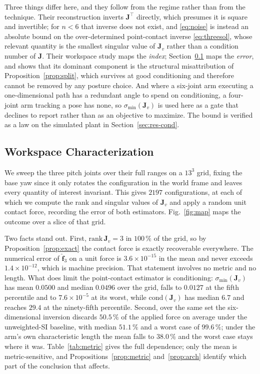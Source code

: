 \documentclass{ieeeaccess}
\newcommand{\Jv}{\bm{J}_{\!v}}
\newcommand{\Jfull}{\bm{J}}
\begin{document}
Three things differ here, and they follow from the regime rather than from the
technique. Their reconstruction inverts $\bm J^{\!\top}$ directly, which presumes
it is square and invertible; for $n<6$ that inverse does not exist, and
\eqref{eq:noise} is instead an absolute bound on the over-determined point-contact
inverse \eqref{eq:threesol}, whose relevant quantity is the smallest singular value
of $\Jv$ rather than a condition number of $\Jfull$. Their workspace study maps the
\emph{index}; Section~\ref{sec:sweep} maps the \emph{error}, and shows that its
dominant component is the structural misattribution of
Proposition~\ref{prop:split}, which survives at good conditioning and therefore
cannot be removed by any posture choice. And where a six-joint arm executing a
one-dimensional path has a redundant angle to spend on conditioning, a four-joint
arm tracking a pose has none, so $\sigma_{\min}(\Jv)$ is used here as a gate that
declines to report rather than as an objective to maximize. The bound is verified
as a law on the simulated plant in Section~\ref{sec:res-cond}.

\subsection{Workspace Characterization}
\label{sec:sweep}
We sweep the three pitch joints over their full ranges on a $13^3$ grid, fixing
the base yaw since it only rotates the configuration in the world frame and leaves every
quantity of interest invariant. This gives $2197$ configurations, at each of which
we compute the rank and singular values of $\Jv$ and apply a random unit contact
force, recording the error of both estimators. Fig.~\ref{fig:map} maps the
outcome over a slice of that grid.


Two facts stand out. First, $\mathrm{rank}\,\Jv=3$ in $100\,\%$ of the grid, so by
Proposition~\ref{prop:exact} the contact force is exactly recoverable everywhere.
The numerical error of $\hat{\bm f}_{3}$ on a unit force is $3.6\times10^{-15}$ in
the mean and never exceeds $1.4\times10^{-12}$, which is machine precision. That
statement involves no metric and no length. What does limit the point-contact
estimator is conditioning: $\sigma_{\min}(\Jv)$ has mean $0.0500$ and median
$0.0496$ over the grid, falls to $0.0127$ at the fifth percentile and to
$7.6\times10^{-5}$ at its worst, while $\mathrm{cond}(\Jv)$ has median $6.7$ and
reaches $29.4$ at the ninety-fifth percentile. Second, over the same set the
six-dimensional inversion discards $50.5\,\%$ of the applied force on average
under the unweighted-SI baseline, with median $51.1\,\%$ and a worst case of
$99.6\,\%$; under the arm's own characteristic length the mean falls to
$38.0\,\%$ and the worst case stays where it was. Table~\ref{tab:metric} gives the full dependence; only
the mean is metric-sensitive, and Propositions~\ref{prop:metric}
and~\ref{prop:arch} identify which part of the conclusion that affects.
\end{document}
